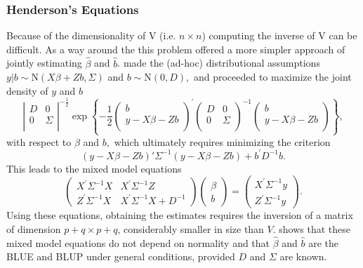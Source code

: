 \documentclass[12pt, a4paper]{report}
\theoremstyle{plain}
\theoremstyle{definition}
\theoremstyle{remark}
\begin{document}
\subsubsection{Henderson's Equations}
Because of the dimensionality of V (i.e. $n \times n$) computing the inverse of V can be difficult. As a way around the this problem \citet{Henderson53, Henderson59,Henderson63,Henderson73,Henderson84a} offered a more simpler approach of jointly estimating $\hat{\beta}$ and $\hat{b}$.
\cite{Henderson:1950} made the (ad-hoc) distributional assumptions $y|b \sim \mathrm{N} (X \beta + Zb, \Sigma)$ and $b \sim \mathrm{N}(0,D),$ and proceeded to maximize the joint density of $y$ and $b$
\begin{equation}
\left|
\begin{array}{cc}
D & 0 \\
0 & \Sigma \\
\end{array}
\right|^{-\frac{1}{2}}
\exp
\left\{ -\frac{1}{2}
\left(
\begin{array}{c}
b \\
y - X \beta -Zb \\
\end{array}
\right)^\prime
\left( \begin{array}{cc}
D & 0 \\
0 & \Sigma \\
\end{array}\right)^{-1}
\left(
\begin{array}{c}
b \\
y - X \beta -Zb \\
\end{array}
\right)
\right\},
\label{u&beta:JointDensity}
\end{equation}
with respect to $\beta$ and $b,$ which ultimately requires minimizing the criterion
\begin{equation}
(y - X \beta -Zb)'\Sigma^{-1}(y - X \beta -Zb) + b^\prime D^{-1}b.
\label{Henderson:Criterion}
\end{equation}
This leads to the mixed model equations
\begin{equation}
\left(\begin{array}{cc}
X^\prime\Sigma^{-1}X & X^\prime\Sigma^{-1}Z
\\
Z^\prime\Sigma^{-1}X & X^\prime\Sigma^{-1}X + D^{-1}
\end{array}\right)
\left(\begin{array}{c}
\beta \\
b
\end{array}\right)
=
\left(\begin{array}{c}
X^\prime\Sigma^{-1}y \\
Z^\prime\Sigma^{-1}y
\end{array}\right).
\label{Henderson:Equations}
\end{equation}
Using these equations, obtaining the estimates requires the inversion of a matrix
of dimension $p+q \times p+q$, considerably smaller in size than $V$. \citet{Henderson63} shows that these mixed model equations do not depend on normality and that $\hat{\beta}$ and $\hat{b}$ are the BLUE and BLUP under general conditions, provided $D$ and $\Sigma$ are known.
\end{document}
